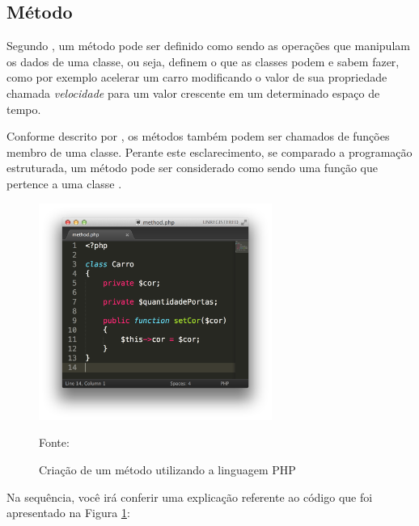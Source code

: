 \subsection{Método}

Segundo , um
método pode ser definido como sendo as operações que manipulam os dados de uma
classe, ou seja, definem o que as classes podem e sabem fazer, como por exemplo
acelerar um carro modificando o valor de sua propriedade chamada
\textit{velocidade} para um valor crescente em um determinado espaço de tempo.

Conforme descrito por , os métodos também podem ser 
chamados de funções membro de uma classe. Perante este esclarecimento, se
comparado a programação estruturada, um método pode ser considerado como
sendo uma função que pertence a uma classe \cite{programmingPhp}.

\begin{figure}[h!tb]
	\caption{Criação de um método utilizando a linguagem PHP}
	\label{fig:metodo}

	\centering
	\includegraphics[width=0.68\textwidth]{images/method.png}

	\centering
	\footnotesize Fonte: \fonteOAutor
\end{figure}

\FloatBarrier 	%

Na sequência, você irá conferir uma explicação referente ao código que foi
apresentado na Figura \ref{fig:metodo}:

